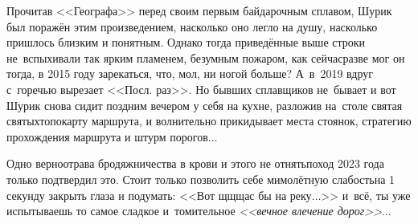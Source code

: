 {{Прочитав <<Географа>> перед своим первым байдарочным сплавом, Шурик был поражён этим произведением, насколько оно легло на душу, насколько пришлось близким и понятным. Однако тогда приведённые выше строки не~вспыхивали так ярким пламенем, безумным пожаром, как сейчас\mdash разве мог он тогда, в 2015 году зарекаться, что, мол, ни ногой больше? А~в~2019 вдруг с~горечью вырезает <<Посл. раз>>. Но бывших сплавщиков не~бывает и вот Шурик снова сидит поздним вечером у себя на кухне, разложив на~столе святая святых\mdash топокарту маршрута, и волнительно прикидывает места стоянок, стратегию прохождения маршрута и штурм порогов$\ldots$ 

Одно верно\mdash отрава бродяжничества в крови и этого не отнять\mdash поход 2023 года только подтвердил это. Стоит только позволить себе мимолётную слабость\mdash на 1 секунду закрыть глаза и подумать: <<Вот щ\sdash щ\sdash щас бы на реку$\ldots$>> и~всё, ты уже испытываешь то самое сладкое и~томительное \textit{<<вечное влечение дорог>>}$\ldots$

\begin{center}
\end{center}



}

}
